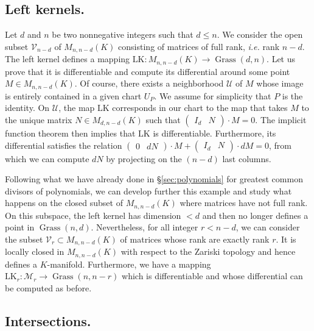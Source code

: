 \documentclass{sig-alternate}
\DeclareMathOperator{\Grass}{Grass}
\begin{document}
{\subsection*{Left kernels.}

Let $d$ and $n$ be two nonnegative integers such that $d \leq n$.
We consider the open subset $\mathcal V_{n-d}$ of $M_{n,n-d}(K)$ 
consisting of matrices of full rank, \emph{i.e.} rank $n-d$. The left 
kernel defines a mapping $\text{LK} : M_{n,n-d}(K) \to \Grass(d,n)$. Let 
us prove that it is differentiable and compute its differential around 
some point $M \in M_{n,n-d}(K)$. Of course, there exists a neighborhood 
$\mathcal U$ of $M$ whose image is entirely contained in a given chart 
$U_P$. We assume for simplicity that $P$ is the identity. On $\mathcal 
U$, the map $\text{LK}$ corresponds in our chart to the map that 
takes $M$ to the unique matrix $N \in M_{d, n-d}(K)$ such that 
$\begin{pmatrix} I_d & N \end{pmatrix} \cdot M = 0$. The implicit 
function theorem then implies that $\text{LK}$ is differentiable. 
Furthermore, its differential satisfies the relation
$\begin{pmatrix} 0 & dN \end{pmatrix} \cdot M +
\begin{pmatrix} I_d & N \end{pmatrix} \cdot dM = 0$,
from which we can compute $dN$ by projecting on the $(n-d)$ last
columns.

Following what we have already done in \S \ref{sec:polynomials} for 
greatest common divisors of polynomials, we can develop further this 
example and study what happens on the closed subset of $M_{n,n-d}(K)$ 
where matrices have not full rank. On this subspace, the left kernel has 
dimension $< d$ and then no longer defines a point in $\Grass(n,d)$. 
Nevertheless, for all integer $r < n-d$, we can consider the subset 
$\mathcal V_r \subset M_{n,n-d}(K)$ of matrices whose rank are exactly 
rank $r$. It is locally closed in $M_{n,n-d}(K)$ with respect to the 
Zariski topology and hence defines a $K$-manifold. Furthermore, we have a 
mapping $\text{LK}_r : \mathcal M_r \to \Grass(n,n-r)$ which is 
differentiable and whose differential can be computed as before.

\subsection*{Intersections.}

}
\end{document}

